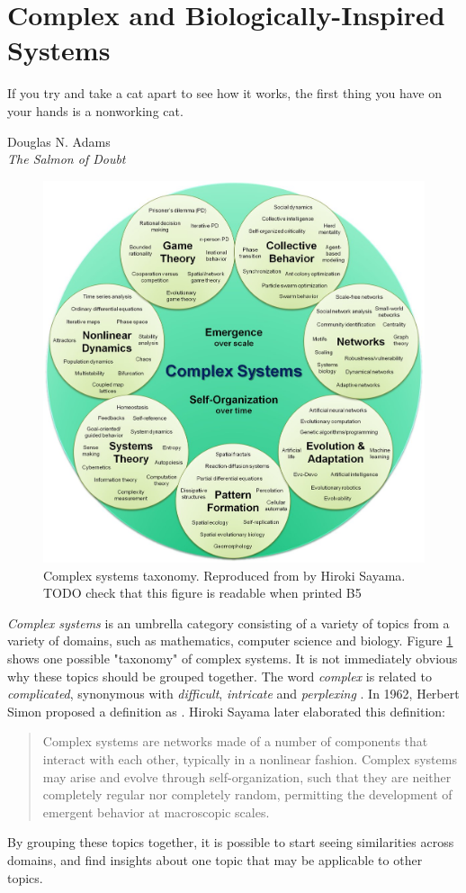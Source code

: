 \section{Complex and Biologically-Inspired Systems}
\epigraph
{
If you try and take a cat apart to see how it works, the first thing you have on your hands is a nonworking cat.
}
{Douglas N. Adams \\ \textit{The Salmon of Doubt} \cite{adams2002salmon}}

\begin{figure}
\centering
\includegraphics[width=.65\textwidth]{fig/complex_systems_sayama}
\caption[Complex systems taxonomy]{Complex systems taxonomy. Reproduced from \cite{sayama2015introduction} by Hiroki Sayama. TODO check that this figure is readable when printed B5}
\label{fig:complex_systems_taxonomy}
\end{figure}

\textit{Complex systems} is an umbrella category consisting of a variety of topics from a variety of domains, such as mathematics, computer science and biology.
Figure \ref{fig:complex_systems_taxonomy} shows one possible "taxonomy" of complex systems.
It is not immediately obvious why these topics should be grouped together.
The word \textit{complex} is related to \textit{complicated}, synonymous with \textit{difficult}, \textit{intricate} and \textit{perplexing} \cite{Thesaurus.com2017}.
In 1962, Herbert Simon proposed a definition as .
Hiroki Sayama later elaborated this definition:
\blockquote[\cite{sayama2015introduction}]{
Complex systems are networks made of a number of components that interact with each other, typically in a nonlinear fashion.
Complex systems may arise and evolve through self-organization, such that they are neither completely regular nor completely random, permitting the development of emergent behavior at macroscopic scales.
}
By grouping these topics together,
it is possible to start seeing similarities across domains,
and find insights about one topic that may be applicable to other topics.

